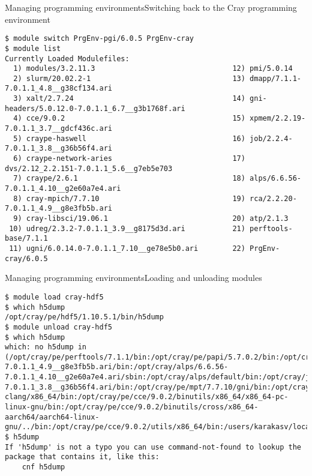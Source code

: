 \begin{frame}[fragile]{Managing programming environments}{Switching back to the Cray programming environment}
  \begin{lstlisting}[style=console]
$ module switch PrgEnv-pgi/6.0.5 PrgEnv-cray
$ module list
Currently Loaded Modulefiles:
  1) modules/3.2.11.3                                12) pmi/5.0.14
  2) slurm/20.02.2-1                                 13) dmapp/7.1.1-7.0.1.1_4.8__g38cf134.ari
  3) xalt/2.7.24                                     14) gni-headers/5.0.12.0-7.0.1.1_6.7__g3b1768f.ari
  4) cce/9.0.2                                       15) xpmem/2.2.19-7.0.1.1_3.7__gdcf436c.ari
  5) craype-haswell                                  16) job/2.2.4-7.0.1.1_3.8__g36b56f4.ari
  6) craype-network-aries                            17) dvs/2.12_2.2.151-7.0.1.1_5.6__g7eb5e703
  7) craype/2.6.1                                    18) alps/6.6.56-7.0.1.1_4.10__g2e60a7e4.ari
  8) cray-mpich/7.7.10                               19) rca/2.2.20-7.0.1.1_4.9__g8e3fb5b.ari
  9) cray-libsci/19.06.1                             20) atp/2.1.3
 10) udreg/2.3.2-7.0.1.1_3.9__g8175d3d.ari           21) perftools-base/7.1.1
 11) ugni/6.0.14.0-7.0.1.1_7.10__ge78e5b0.ari        22) PrgEnv-cray/6.0.5
  \end{lstlisting}
\end{frame}

\begin{frame}[fragile]{Managing programming environments}{Loading and unloading modules}
  \begin{lstlisting}[style=console]
$ module load cray-hdf5
$ which h5dump
/opt/cray/pe/hdf5/1.10.5.1/bin/h5dump
$ module unload cray-hdf5
$ which h5dump
which: no h5dump in (/opt/cray/pe/perftools/7.1.1/bin:/opt/cray/pe/papi/5.7.0.2/bin:/opt/cray/rca/2.2.20-7.0.1.1_4.9__g8e3fb5b.ari/bin:/opt/cray/alps/6.6.56-7.0.1.1_4.10__g2e60a7e4.ari/sbin:/opt/cray/alps/default/bin:/opt/cray/job/2.2.4-7.0.1.1_3.8__g36b56f4.ari/bin:/opt/cray/pe/mpt/7.7.10/gni/bin:/opt/cray/pe/craype/2.6.1/bin:/opt/cray/pe/cce/9.0.2/cce-clang/x86_64/bin:/opt/cray/pe/cce/9.0.2/binutils/x86_64/x86_64-pc-linux-gnu/bin:/opt/cray/pe/cce/9.0.2/binutils/cross/x86_64-aarch64/aarch64-linux-gnu/../bin:/opt/cray/pe/cce/9.0.2/utils/x86_64/bin:/users/karakasv/local/bin:/users/karakasv/local/sbin:/apps/daint/UES/xalt/xalt2/software/xalt/2.7.24/sbin:/apps/daint/UES/xalt/xalt2/software/xalt/2.7.24/bin:/opt/cray/pe/modules/3.2.11.3/bin:/apps/daint/system/bin:/apps/common/system/bin:/usr/local/bin:/usr/bin:/bin:/usr/lib/mit/bin:/usr/lib/mit/sbin:/opt/cray/pe/bin)
$ h5dump
If 'h5dump' is not a typo you can use command-not-found to lookup the package that contains it, like this:
    cnf h5dump
  \end{lstlisting}
\end{frame}


